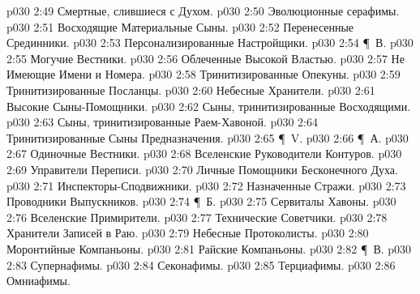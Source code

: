 \vs p030 2:49 \bibnobreakspace Смертные, слившиеся с Духом.
\vs p030 2:50 \bibnobreakspace Эволюционные серафимы.
\vs p030 2:51 \bibnobreakspace Восходящие Материальные Сыны.
\vs p030 2:52 \bibnobreakspace Перенесенные Срединники.
\vs p030 2:53 \bibnobreakspace Персонализированные Настройщики.
\vs p030 2:54 \P\ В. 
\vs p030 2:55 \bibnobreakspace Могучие Вестники.
\vs p030 2:56 \bibnobreakspace Облеченные Высокой Властью.
\vs p030 2:57 \bibnobreakspace Не Имеющие Имени и Номера.
\vs p030 2:58 \bibnobreakspace Тринитизированные Опекуны.
\vs p030 2:59 \bibnobreakspace Тринитизированные Посланцы.
\vs p030 2:60 \bibnobreakspace Небесные Хранители.
\vs p030 2:61 \bibnobreakspace Высокие Сыны\hyp{}Помощники.
\vs p030 2:62 \bibnobreakspace Сыны, тринитизированные Восходящими.
\vs p030 2:63 \bibnobreakspace Сыны, тринитизированные Раем\hyp{}Хавоной.
\vs p030 2:64 \bibnobreakspace Тринитизированные Сыны Предназначения.
\vs p030 2:65 \P\ V. 
\vs p030 2:66 \P\ А. 
\vs p030 2:67 \bibnobreakspace Одиночные Вестники.
\vs p030 2:68 \bibnobreakspace Вселенские Руководители Контуров.
\vs p030 2:69 \bibnobreakspace Управители Переписи.
\vs p030 2:70 \bibnobreakspace Личные Помощники Бесконечного Духа.
\vs p030 2:71 \bibnobreakspace Инспекторы\hyp{}Сподвижники.
\vs p030 2:72 \bibnobreakspace Назначенные Стражи.
\vs p030 2:73 \bibnobreakspace Проводники Выпускников.
\vs p030 2:74 \P\ Б. 
\vs p030 2:75 \bibnobreakspace Сервиталы Хавоны.
\vs p030 2:76 \bibnobreakspace Вселенские Примирители.
\vs p030 2:77 \bibnobreakspace Технические Советчики.
\vs p030 2:78 \bibnobreakspace Хранители Записей в Раю.
\vs p030 2:79 \bibnobreakspace Небесные Протоколисты.
\vs p030 2:80 \bibnobreakspace Моронтийные Компаньоны.
\vs p030 2:81 \bibnobreakspace Райские Компаньоны.
\vs p030 2:82 \P\ В. 
\vs p030 2:83 \bibnobreakspace Супернафимы.
\vs p030 2:84 \bibnobreakspace Секонафимы.
\vs p030 2:85 \bibnobreakspace Терциафимы.
\vs p030 2:86 \bibnobreakspace Омниафимы.

